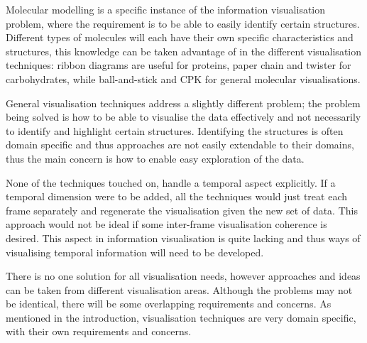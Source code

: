 \documentclass[a4paper]{article}
\begin{document}
Molecular modelling is a specific instance of the information visualisation
problem, where the requirement is to be able to easily identify certain
structures. Different types of molecules will each have their own specific
characteristics and structures, this knowledge can be taken advantage of in the
different visualisation techniques: ribbon diagrams are useful for proteins,
paper chain and twister for carbohydrates, while ball-and-stick and CPK for
general molecular visualisations.

General visualisation techniques address a slightly different problem; the
problem being solved is how to be able to visualise the data effectively and
not necessarily to identify and highlight certain structures. Identifying the
structures is often domain specific and thus approaches are not easily
extendable to their domains, thus the main concern is how to enable easy
exploration of the data.

None of the techniques touched on, handle a temporal aspect explicitly. If a
temporal dimension were to be added, all the techniques would just treat each
frame separately and regenerate the visualisation given the new set of data.
This approach would not be ideal if some inter-frame visualisation coherence is
desired. This aspect in information visualisation is quite lacking and thus ways
of visualising temporal information will need to be developed.

There is no one solution for all visualisation needs, however approaches and
ideas can be taken from different visualisation areas. Although the problems
may not be identical, there will be some overlapping requirements and concerns.
As mentioned in the introduction, visualisation techniques are very domain
specific, with their own requirements and concerns.


% 


\end{document}
